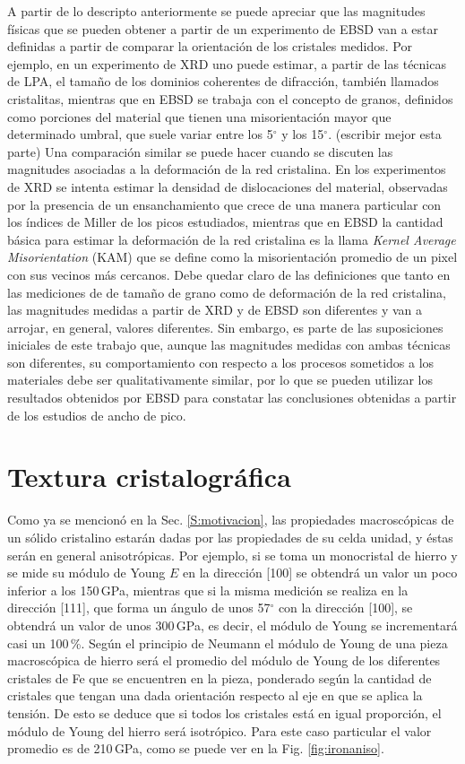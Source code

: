 A partir de lo descripto anteriormente se puede apreciar que las magnitudes físicas que se pueden obtener a partir de un experimento de EBSD van a estar definidas a partir de comparar la orientación de los cristales medidos.
Por ejemplo, en un experimento de XRD uno puede estimar, a partir de las técnicas de LPA, el tamaño de los dominios coherentes de difracción, también llamados cristalitas, mientras que en EBSD se trabaja con el concepto de granos, definidos como porciones del material que tienen una misorientación mayor que determinado umbral, que suele variar entre los 5$^{\circ}$ y los 15$^{\circ}$. (escribir mejor esta parte)
Una comparación similar se puede hacer cuando se discuten las magnitudes asociadas a la deformación de la red cristalina. En los experimentos de XRD se intenta estimar la densidad de dislocaciones del material, observadas por la presencia de un ensanchamiento que crece de una manera particular con los índices  de Miller de los picos estudiados, mientras que en EBSD la cantidad básica para estimar la deformación de la red cristalina es la llama \textit{Kernel Average Misorientation} (KAM) que se define como la misorientación promedio de un pixel con sus vecinos más cercanos.
Debe quedar claro de las definiciones que tanto en las mediciones de de tamaño de grano como de deformación de la red cristalina, las magnitudes medidas a partir de XRD y de EBSD son diferentes y van a arrojar, en general, valores diferentes.
Sin embargo, es parte de las suposiciones iniciales de este trabajo que, aunque las magnitudes medidas con ambas técnicas son diferentes, su comportamiento con respecto a los procesos sometidos a los materiales debe ser qualitativamente similar, por lo que se pueden utilizar los resultados obtenidos por EBSD para constatar las conclusiones obtenidas a partir de los estudios de ancho de pico.

\section{Textura cristalográfica}\label{S:Text}
Como ya se mencionó en la Sec. \ref{S:motivacion}, las propiedades macroscópicas de un sólido cristalino estarán dadas por las propiedades de su celda unidad, y éstas serán en general anisotrópicas.
Por ejemplo, si se toma un monocristal de hierro y se mide su módulo de Young $E$ en la dirección [100] se obtendrá un valor un poco inferior a los 150\,GPa, mientras que si la misma medición se realiza en la dirección [111], que forma un ángulo de unos 57$^{\circ}$ con la dirección [100], se obtendrá un valor de unos 300\,GPa, es decir, el módulo de Young se incrementará casi un 100\,\%.
Según el principio de Neumann\cite{nye1985physical} el módulo de Young de una pieza macroscópica de hierro será el promedio del módulo de Young de los diferentes cristales de Fe que se encuentren en la pieza, ponderado según la cantidad de cristales que tengan una dada orientación respecto al eje en que se aplica la tensión.
De esto se deduce que si todos los cristales está en igual proporción, el módulo de Young del hierro será isotrópico.
Para este caso particular el valor promedio es de 210\,GPa, como se puede ver en la Fig. \ref{fig:ironaniso}.

